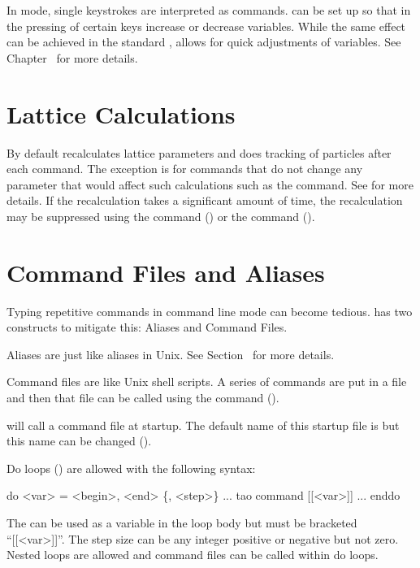 In  mode, single keystrokes are interpreted as commands. \tao can be set up so that in
 the pressing of certain keys increase or decrease variables. While the same effect
can be achieved in the standard ,  allows for quick adjustments of
variables. See Chapter~ for more details.

\section{Lattice Calculations}
\label{s:lat.calc.overview} 

By default \tao recalculates lattice parameters and does tracking of particles after each command.
The exception is for commands that do not change any parameter that would affect such calculations
such as the  command. See  for more details. If the recalculation takes a
significant amount of time, the recalculation may be suppressed using the  command () or the  command
().

\section{Command Files and Aliases}
\label{s:command.files} 

Typing repetitive commands in command line mode can become tedious. \tao has two constructs to
mitigate this: Aliases and Command Files. 

Aliases are just like aliases in Unix. See Section~ for more details.

Command files are like Unix shell scripts. A series of commands are
put in a file and then that file can be called using the 
command ().

\tao will call a command file at startup. The default name of this startup file is 
but this name can be changed ().

Do loops () are allowed with the following syntax:
\begin{example}
  do <var> = <begin>, <end> \{, <step>\} 
    ...
    tao command [[<var>]]
    ...
  enddo
\end{example}
The  can be used as a variable in the loop body but must be
bracketed ``[[<var>]]''.  The step size can be any integer positive or
negative but not zero.  Nested loops are allowed and command files can
be called within do loops.

